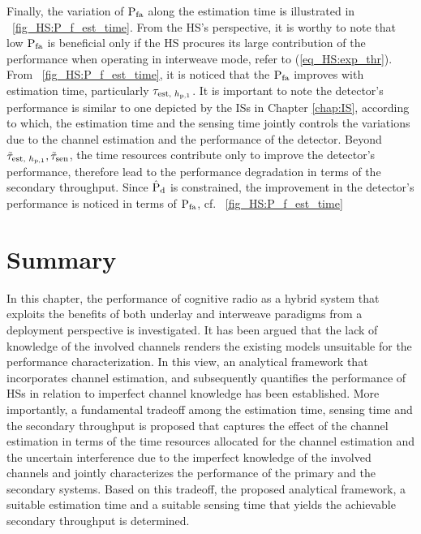 Finally, the variation of $\text{P}_{\text{fa}}$ along the estimation time is illustrated in \figurename~\ref{fig_HS:P_f_est_time}. From the HS's perspective, it is worthy to note that low $\text{P}_{\text{fa}}$ is beneficial only if the HS procures its large contribution of the performance when operating in interweave mode, refer to (\ref{eq_HS:exp_thr}). From \figurename~\ref{fig_HS:P_f_est_time}, it is noticed that the $\text{P}_{\text{fa}}$ improves with estimation time, particularly $\tau_{\text{est, $h_{\text{p,1}}$}}$. It is important to note the detector's performance is similar to one depicted by the ISs in Chapter \ref{chap:IS}, according to which, the estimation time and the sensing time jointly controls the variations due to the channel estimation and the performance of the detector. Beyond $\tilde{\tau}_{\text{est, $h_{\text{p,1}}$}}, \tilde{\tau}_{\text{sen}}$, the time resources contribute only to improve the detector's performance, therefore lead to the performance degradation in terms of the secondary throughput. Since $\hat{\text{P}}_{\text{d}}$ is constrained, the improvement in the detector's performance is noticed in terms of $\text{P}_{\text{fa}}$, cf. \figurename~\ref{fig_HS:P_f_est_time} 

\section{Summary} \label{sec:conc}
In this chapter, the performance of cognitive radio as a hybrid system that exploits the benefits of both underlay and interweave paradigms from a deployment perspective is investigated. It has been argued that the lack of knowledge of the involved channels renders the existing models unsuitable for the performance characterization. In this view, an analytical framework that incorporates channel estimation, and subsequently quantifies the performance of HSs in relation to imperfect channel knowledge has been established. More importantly, a fundamental tradeoff among the estimation time, sensing time and the secondary throughput is proposed that captures the effect of the channel estimation in terms of the time resources allocated for the channel estimation and the uncertain interference due to the imperfect knowledge of the involved channels and jointly characterizes the performance of the primary and the secondary systems. Based on this tradeoff, the proposed analytical framework, a suitable estimation time and a suitable sensing time that yields the achievable secondary throughput is determined. %

